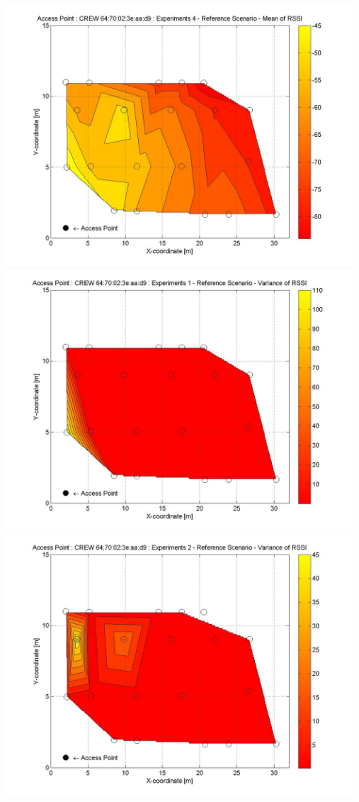 \documentclass[11pt,a4paper,headinclude,footinclude,chapterprefix=on]{scrreprt}
\begin{document}
\begin{longtable}
	\includegraphics[width=13cm]{../../Source/plot/CREW_d9/d9_Ref_Ex_4_Mean.jpg} \\
	\includegraphics[width=13cm]{../../Source/plot/CREW_d9/d9_Ref_Ex_1_Variance.jpg} \\
	\includegraphics[width=13cm]{../../Source/plot/CREW_d9/d9_Ref_Ex_2_Variance.jpg} \\

\end{longtable}
\end{document}
